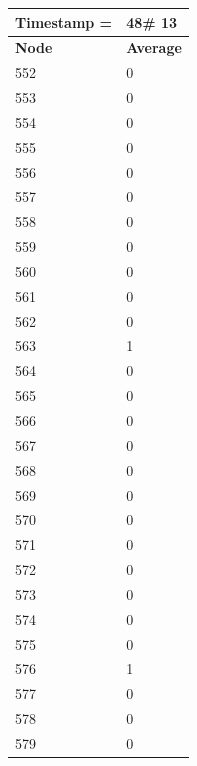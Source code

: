 \begin{tabular}{|l||l|}
\hline
\textbf{Timestamp =} & \textbf{48}\# 13\\\hline
	\textbf{Node} & \textbf{Average} \\ \hline
\hline
	552 & 0 \\ \hline
	553 & 0 \\ \hline
	554 & 0 \\ \hline
	555 & 0 \\ \hline
	556 & 0 \\ \hline
	557 & 0 \\ \hline
	558 & 0 \\ \hline
	559 & 0 \\ \hline
	560 & 0 \\ \hline
	561 & 0 \\ \hline
	562 & 0 \\ \hline
	563 & 1 \\ \hline
	564 & 0 \\ \hline
	565 & 0 \\ \hline
	566 & 0 \\ \hline
	567 & 0 \\ \hline
	568 & 0 \\ \hline
	569 & 0 \\ \hline
	570 & 0 \\ \hline
	571 & 0 \\ \hline
	572 & 0 \\ \hline
	573 & 0 \\ \hline
	574 & 0 \\ \hline
	575 & 0 \\ \hline
	576 & 1 \\ \hline
	577 & 0 \\ \hline
	578 & 0 \\ \hline
	579 & 0 \\ \hline
\end{tabular}

